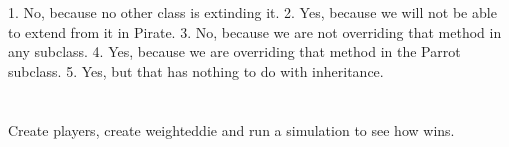 \documentclass[a4paper, 11pt]{article}
\begin{document}
\begin{solution}
  1. No, because no other class is extinding it.
  2. Yes, because we will not be able to extend from it in Pirate.
  3. No, because we are not overriding that method in any subclass.
  4. Yes, because we are overriding that method in the Parrot subclass.
  5. Yes, but that has nothing to do with inheritance.
\end{solution}
















\section{}

Create players, create weighteddie and run a simulation to see how wins.
\end{document}
